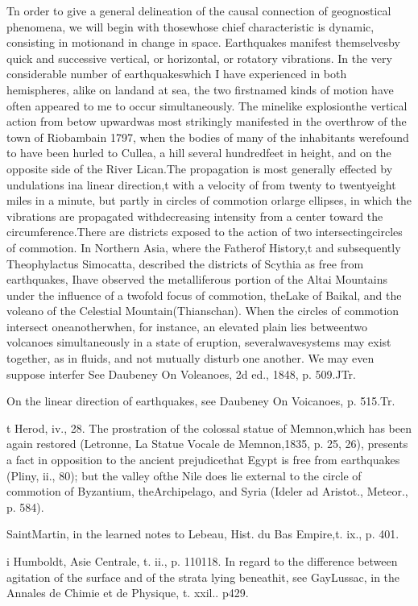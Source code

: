 Tn order to give a general delineation of the causal connection of geognostical phenomena, we will begin with thosewhose chief characteristic is dynamic, consisting in motionand in change in space. Earthquakes manifest themselvesby quick and successive vertical, or horizontal, or rotatory vibrations. In the very considerable number of earthquakeswhich I have experienced in both hemispheres, alike on landand at sea, the two firstnamed kinds of motion have often appeared to me to occur simultaneously. The minelike explosionthe vertical action from betow upwardwas most strikingly manifested in the overthrow of the town of Riobambain 1797, when the bodies of many of the inhabitants werefound to have been hurled to Cullea, a hill several hundredfeet in height, and on the opposite side of the River Lican.The propagation is most generally effected by undulations ina linear direction,t with a velocity of from twenty to twentyeight miles in a minute, but partly in circles of commotion orlarge ellipses, in which the vibrations are propagated withdecreasing intensity from a center toward the circumference.There are districts exposed to the action of two intersectingcircles of commotion. In Northern Asia, where the Fatherof History,t and subsequently Theophylactus Simocatta, described the districts of Scythia as free from earthquakes, Ihave observed the metalliferous portion of the Altai Mountains under the influence of a twofold focus of commotion, theLake of Baikal, and the voleano of the Celestial Mountain(Thianschan). When the circles of commotion intersect oneanotherwhen, for instance, an elevated plain lies betweentwo volcanoes simultaneously in a state of eruption, severalwavesystems may exist together, as in fluids, and not mutually disturb one another. We may even suppose interfer  See Daubeney On Voleanoes, 2d ed., 1848, p. 509.JTr.

 On the linear direction of earthquakes, see Daubeney On Voicanoes, p. 515.Tr.

t Herod, iv., 28. The prostration of the colossal statue of Memnon,which has been again restored (Letronne, La Statue Vocale de Memnon,1835, p. 25, 26), presents a fact in opposition to the ancient prejudicethat Egypt is free from earthquakes (Pliny, ii., 80); but the valley ofthe Nile does lie external to the circle of commotion of Byzantium, theArchipelago, and Syria (Ideler ad Aristot., Meteor., p. 584).

 SaintMartin, in the learned notes to Lebeau, Hist. du Bas Empire,t. ix., p. 401.

i Humboldt, Asie Centrale, t. ii., p. 110118. In regard to the difference between agitation of the surface and of the strata lying beneathit, see GayLussac, in the Annales de Chimie et de Physique, t. xxil.. p429.
    